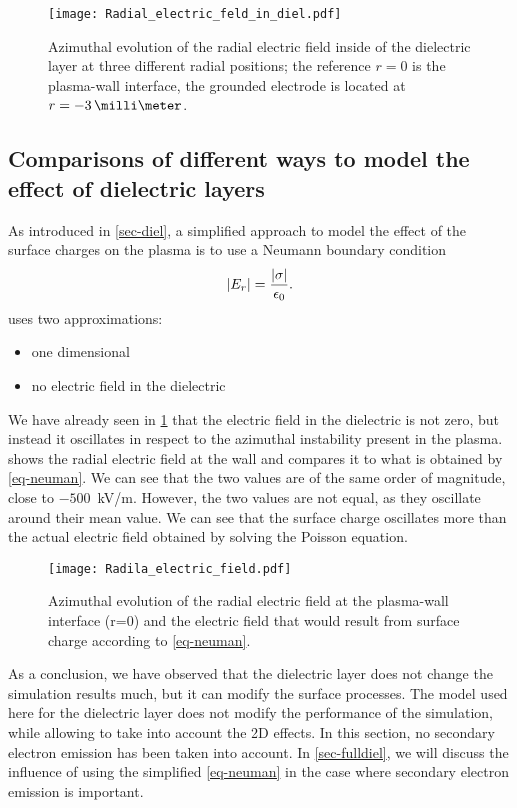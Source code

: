     \begin{figure}[!hbt]
      \centering
      \texttt{[image: Radial\_electric\_feld\_in\_diel.pdf]}
      \caption{Azimuthal evolution of the radial electric field inside of the dielectric layer at three different radial positions; the reference $r=0$ is the plasma-wall interface, the grounded electrode is located at $r=-3\,\milli\meter$.}
      \label{fig-indiel}
    \end{figure}

    
  \subsection{Comparisons of different ways to model the effect of dielectric layers} \label{subsec-modelcomp}

  
  As introduced in \cref{sec-diel}, a simplified approach to model the effect of the surface charges on the plasma is to use a Neumann boundary condition \citep{taccogna2019}
  \begin{equation} \label{eq-neuman}
    \lvert E_r\rvert = \frac{\lvert\sigma\rvert}{\epsilon_0}.
  \end{equation}
   uses two approximations\string:
  \begin{itemize}
    \item one dimensional
    \item no electric field in the dielectric
  \end{itemize}
  We have already seen in \cref{fig-indiel} that the electric field in the dielectric is not zero, but instead it oscillates in respect to the azimuthal instability present in the plasma.  
   shows the radial electric field at the wall and compares it to what is obtained by \cref{eq-neuman}.
  We can see that the two values are of the same order of magnitude, close to $-500$~kV/m.
  However, the two values are not equal, as they oscillate around their mean value.
  We can see that the surface charge oscillates more than the actual electric field obtained by solving the Poisson equation.

\begin{figure}[!hbt]
  \centering
  \texttt{[image: Radila\_electric\_field.pdf]}
  \caption{Azimuthal evolution of the radial electric field at the plasma-wall interface (r=0) and the electric field that would result from surface charge according to \cref{eq-neuman}.}
  \label{fig-spacial_comparaison}
\end{figure}
\renewcommand\subfigurewidth{0.45\textwidth}

  As a conclusion, we have observed that the dielectric layer does not change the simulation results much, but it can modify the surface processes.
  The model used here for the dielectric layer does not modify the performance of the simulation, while allowing to take into account the \ac{2D} effects.
  In this section, no secondary electron emission has been taken into account.
  In \cref{sec-fulldiel}, we will discuss the influence of using the simplified \cref{eq-neuman} in the case where secondary electron emission is important.

  